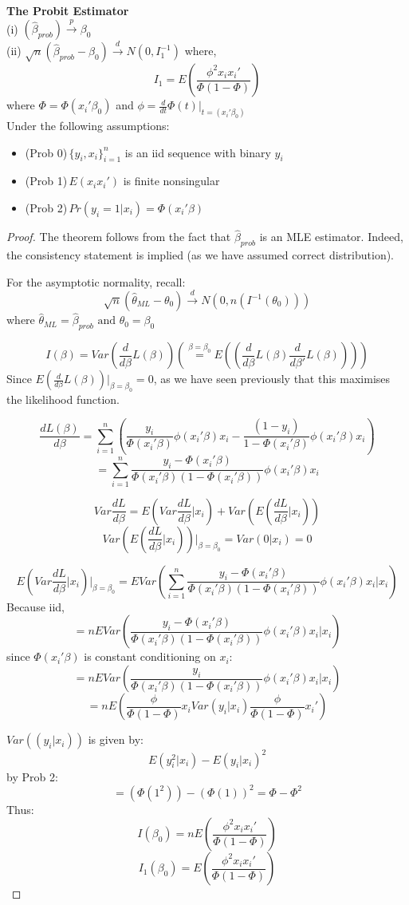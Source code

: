\documentclass[DIV=14,titlepage=false]{scrreprt}
\begin{document}
\vspace{5mm}
\begin{theorem} \textbf{The Probit Estimator}
\\ (i) \((\hat\beta_{prob})\xrightarrow{p}\beta_0\)
\\ (ii) \(\sqrt{n}(\hat\beta_{prob}-\beta_0)\xrightarrow{d}N(0,I_1^{-1})\) where,
\[I_1=E\left(\frac{\phi^2x_ix_i'}{\Phi(1-\Phi)}\right)\]
where \(\Phi=\Phi(x_i'\beta_0)\) and \(\phi=\frac{d}{dt}\Phi(t)\big|_{t=(x_i'\beta_0)}\)
\\ Under the following assumptions:
\begin{itemize}
    \item (Prob 0)\,\(\{y_i,x_i\}_{i=1}^n\) is an iid sequence with binary \(y_i\)
    \item (Prob 1)\,\(E(x_ix_i')\) is finite nonsingular
    \item (Prob 2)\,\(Pr(y_i=1|x_i)=\Phi(x_i'\beta)\)
\end{itemize}
\end{theorem}
\vspace{5mm}
\begin{proof}
The theorem follows from the fact that \(\hat{\beta}_{prob}\) is an MLE estimator. Indeed, the consistency statement is implied (as we have assumed correct distribution).

For the asymptotic normality, recall:
\[\sqrt{n}(\hat\theta_{ML}-\theta_0)\xrightarrow{d}N(0,n(I^{-1}(\theta_0)))\]
where \(\hat{\theta}_{ML}=\hat{\beta}_{prob} \text{ and } \theta_0=\beta_0\)

\[I(\beta)=Var\left(\frac{d}{d\beta}L(\beta)\right)\left(\stackrel{\beta=\beta_0}{=}E\left((\frac{d}{d\beta}L({\beta})\frac{d}{d\beta'}L({\beta}))\right)\right)\]
Since \(E(\frac{d}{d\beta}L(\beta))\big|_{\beta=\beta_0}=0\), as we have seen previously that this maximises the likelihood function.

\[\frac{dL(\beta)}{d\beta}=\sum_{i=1}^n\left(\frac{y_i}{\Phi(x_i'\beta)}\phi(x_i'\beta) x_i-\frac{(1-y_i)}{1-\Phi(x_i'\beta)}\phi(x_i'\beta)x_i\right)\]
\[=\sum_{i=1}^n\frac{y_i-\Phi(x_i'\beta)}{\Phi(x_i'\beta)(1-\Phi(x_i'\beta))}\phi(x_i'\beta)x_i\]

\[Var\frac{dL}{d\beta}=E(Var\frac{dL}{d\beta}|x_i)+Var(E(\frac{dL}{d\beta}|x_i))\]
\[Var(E(\frac{dL}{d\beta}|x_i))\big|_{\beta=\beta_0}=Var(0|x_i)=0\]

\[E(Var\frac{dL}{d\beta}|x_i)\big|_{\beta=\beta_0}=E Var\left(\sum_{i=1}^n\frac{y_i-\Phi(x_i'\beta)}{\Phi(x_i'\beta)(1-\Phi(x_i'\beta))}\phi(x_i'\beta)x_i|x_i\right)\]
Because iid,
\[=nEVar\left(\frac{y_i-\Phi(x_i'\beta)}{\Phi(x_i'\beta)(1-\Phi(x_i'\beta))}\phi(x_i'\beta)x_i|x_i\right)\]
since \(\Phi(x_i'\beta)\) is constant conditioning on \(x_i\):
\[=nEVar\left(\frac{y_i}{\Phi(x_i'\beta)(1-\Phi(x_i'\beta))}\phi(x_i'\beta)x_i|x_i\right)\]
\[=nE(\frac{\phi}{\Phi(1-\Phi)}x_i Var(y_i|x_i)\frac{\phi}{\Phi(1-\Phi)}x_i')\]

\(Var((y_i|x_i))\) is given by:
\[E(y_i^2|x_i)-E(y_i|x_i)^2\]
by Prob 2:
\[=(\Phi(1^2))-(\Phi(1))^2=\Phi-\Phi^2\]
Thus:
\[I(\beta_0)=nE\left(\frac{\phi^2x_ix_i'}{\Phi(1-\Phi)}\right)\]
\[I_1(\beta_0)=E\left(\frac{\phi^2x_ix_i'}{\Phi(1-\Phi)}\right)\]

\end{proof}
\end{document}
